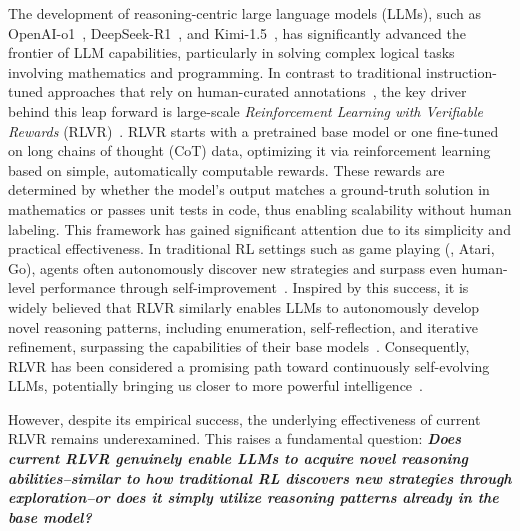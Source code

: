 The development of reasoning-centric large language models (LLMs), such as OpenAI-o1~\cite{jaech2024openaio1}, DeepSeek-R1~\cite{guo2025deepseek-r1}, and Kimi-1.5~\cite{team2025kimi}, has significantly advanced the frontier of LLM capabilities, particularly in solving complex logical tasks involving mathematics and programming. 
In contrast to traditional instruction-tuned approaches that rely on human-curated annotations~\cite{achiam2023gpt4, grattafiori2024llama3}, the key driver behind this leap forward is large-scale \textit{Reinforcement Learning with Verifiable Rewards} (RLVR)~\cite{lambert2024tulu3,guo2025deepseek-r1}. RLVR starts with a pretrained base model or one fine-tuned on long chains of thought (CoT) data, optimizing it via reinforcement learning based on simple, automatically computable rewards. These rewards are determined by whether the model's output matches a ground-truth solution in mathematics or passes unit tests in code, thus enabling scalability without human labeling.
This framework has gained significant attention due to its simplicity and practical effectiveness. 
In traditional RL settings such as game playing (\eg, Atari, Go), agents often autonomously discover new strategies and surpass even human-level performance through self-improvement~\cite{mnih2015dqn, silver2017alphagozero}. Inspired by this success, it is widely believed that RLVR similarly enables LLMs to autonomously develop novel reasoning patterns, including enumeration, self-reflection, and iterative refinement, surpassing the capabilities of their base models~\cite{guo2025deepseek-r1}. Consequently, RLVR has been considered a promising path toward continuously self-evolving LLMs, potentially bringing us closer to more powerful intelligence~\cite{guo2025deepseek-r1}.

However, despite its empirical success, the underlying effectiveness of current RLVR remains underexamined. This raises a fundamental question: \textit{\textbf{Does current RLVR genuinely enable LLMs to acquire novel reasoning abilities--similar to how traditional RL discovers new strategies through exploration--or does it simply utilize reasoning patterns already in the base model?}}

